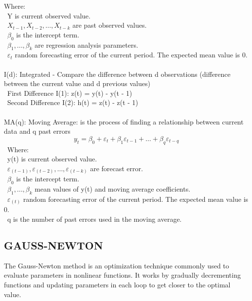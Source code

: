 \documentclass{ieeeojies}
\begin{document}
Where:\\
	\indent\textbullet\ Y is current observed value.\\
	\indent\textbullet\ \(X_{t-1}, X_{t-2}, \ldots, X_{t-k}\) are past observed
values.\\
	\indent\textbullet\ \(\beta_0\) is the intercept term.\\
	\indent\textbullet\ \(\beta_1,..., \beta_k\) are regression analysis
parameters.\\
	\indent\textbullet\ \(\varepsilon_{t}\) random forecasting error of the current
period. The expected mean value is 0.\\
\\
\indent I(d): Integrated - Compare the difference between d observations (difference
between the current value and d previous values)\\
\indent\textbullet\ First Difference I(1): z(t) = y(t) - y(t - 1)\\
\indent\textbullet\ Second Difference I(2): h(t) = z(t) - z(t - 1)\\
\\
\indent MA(q): Moving Average: is the process of finding a relationship between
current data and q past errors\
\indent \[y_{t} = \beta_0 + \varepsilon_{t} + \beta_1\varepsilon_{t - 1} + \ldots + \beta_q\varepsilon_{t - q}\]\
Where:\\
        \indent\textbullet\ y(t) is current observed value.\\
	\indent\textbullet\ \(\varepsilon_(t-1), \varepsilon_(t-2), \ldots, \varepsilon_(t-k)\) are forecast error.\\
	\indent\textbullet\ \(\beta_0\) is the intercept term.\\
	\indent\textbullet\ \(\beta_1,..., \beta_k\) mean values of y(t) and moving
average coefficients.\\
	\indent\textbullet\ \(\varepsilon_(t)\) random forecasting error of the current
period. The expected mean value is 0.\\
        \indent\textbullet\ q is the number of past errors used in the moving average.

\subsection{GAUSS-NEWTON}
\indent The Gauss-Newton method is an optimization technique commonly used to evaluate parameters in nonlinear functions. It works by gradually decrementing functions and updating parameters in each loop to get closer to the optimal value.
\end{document}
